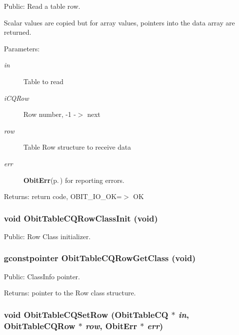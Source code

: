 Public: Read a table row. 

Scalar values are copied but for array values, pointers into the data array are returned. \begin{Desc}
\item[Parameters:]
\begin{description}
\item[{\em in}]Table to read \item[{\em i\-CQRow}]Row number, -1 -$>$ next \item[{\em row}]Table Row structure to receive data \item[{\em err}]{\bf Obit\-Err}{\rm (p.\,\pageref{structObitErr})} for reporting errors. \end{description}
\end{Desc}
\begin{Desc}
\item[Returns:]return code, OBIT\_\-IO\_\-OK=$>$ OK \end{Desc}
\subsubsection{\setlength{\rightskip}{0pt plus 5cm}void Obit\-Table\-CQRow\-Class\-Init (void)}\label{ObitTableCQ_8h_a7}


Public: Row Class initializer. 

\subsubsection{\setlength{\rightskip}{0pt plus 5cm}gconstpointer Obit\-Table\-CQRow\-Get\-Class (void)}\label{ObitTableCQ_8h_a9}


Public: Class\-Info pointer. 

\begin{Desc}
\item[Returns:]pointer to the Row class structure. \end{Desc}
\subsubsection{\setlength{\rightskip}{0pt plus 5cm}void Obit\-Table\-CQSet\-Row ({\bf Obit\-Table\-CQ} $\ast$ {\em in}, {\bf Obit\-Table\-CQRow} $\ast$ {\em row}, {\bf Obit\-Err} $\ast$ {\em err})}\label{ObitTableCQ_8h_a19}


